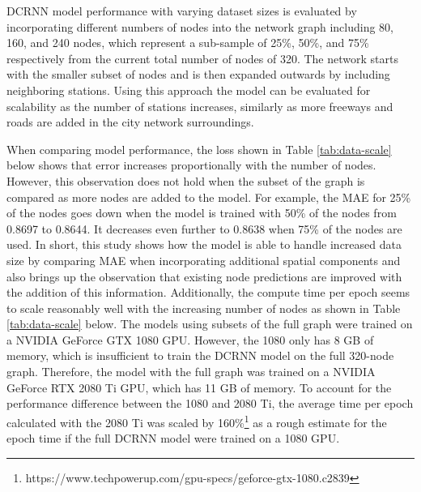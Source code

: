 \documentclass{article}
\begin{document}
DCRNN model performance with varying dataset sizes is evaluated by incorporating different numbers of nodes into the network graph including 80, 160, and 240 nodes, which represent a sub-sample of 25\%, 50\%, and 75\% respectively from the current total number of nodes of 320. The network starts with the smaller subset of nodes and is then expanded outwards by including neighboring stations. Using this approach the model can be evaluated for scalability as the number of stations increases, similarly as more freeways and roads are added in the city network surroundings.

When comparing model performance, the loss shown in Table \ref{tab:data-scale} below shows that error increases proportionally with the number of nodes. However, this observation does not hold when the subset of the graph is compared as more nodes are added to the model. For example, the MAE for 25\% of the nodes goes down when the model is trained with 50\% of the nodes from 0.8697 to 0.8644. It decreases even further to 0.8638 when 75\% of the nodes are used. In short, this study shows how the model is able to handle increased data size by comparing MAE when incorporating additional spatial components and also brings up the observation that existing node predictions are improved with the addition of this information. Additionally, the compute time per epoch seems to scale reasonably well with the increasing number of nodes as shown in Table \ref{tab:data-scale} below. The models using subsets of the full graph were trained on a NVIDIA GeForce GTX 1080 GPU. However, the 1080 only has 8 GB of memory, which is insufficient to train the DCRNN model on the full 320-node graph. Therefore, the model with the full graph was trained on a NVIDIA GeForce RTX 2080 Ti GPU, which has 11 GB of memory. To account for the performance difference between the 1080 and 2080 Ti, the average time per epoch calculated with the 2080 Ti was scaled by 160\%\footnote{https://www.techpowerup.com/gpu-specs/geforce-gtx-1080.c2839} as a rough estimate for the epoch time if the full DCRNN model were trained on a 1080 GPU.
\end{document}
